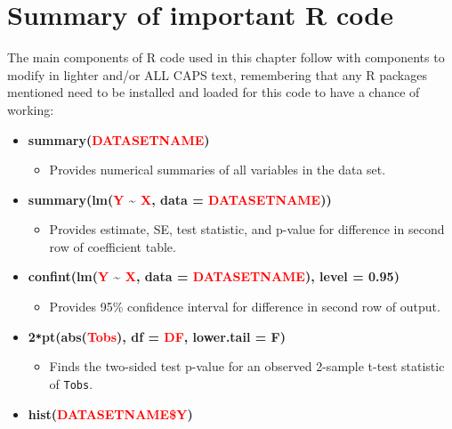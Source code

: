 \documentclass[
]{book}
\providecommand{\tightlist}{%
  \setlength{\itemsep}{0pt}\setlength{\parskip}{0pt}}
\begin{document}
\hypertarget{section2-12}{%
\section{Summary of important R code}\label{section2-12}}

The main components of R code used in this chapter follow with components to
modify in lighter and/or ALL CAPS text, remembering that any R packages mentioned
need to be installed and loaded for this code to have a chance of working:

\begin{itemize}
\item
  \textbf{summary(\textcolor{red}{DATASETNAME})}

  \begin{itemize}
  \tightlist
  \item
    Provides numerical summaries of all variables in the data set.
  \end{itemize}
\item
  \textbf{summary(lm(\textcolor{red}{Y} \textasciitilde{} \textcolor{red}{X},
  data = \textcolor{red}{DATASETNAME}))}

  \begin{itemize}
  \tightlist
  \item
    Provides estimate, SE, test statistic, and p-value for difference in second row of coefficient table. 
  \end{itemize}
\item
  \textbf{confint(lm(\textcolor{red}{Y} \textasciitilde{} \textcolor{red}{X},
  data = \textcolor{red}{DATASETNAME}), level = 0.95)}

  \begin{itemize}
  \tightlist
  \item
    Provides 95\%
    confidence interval for difference in second row of output. 
  \end{itemize}
\item
  \textbf{2\texttt{*}pt(abs(\textcolor{red}{Tobs}), df = \textcolor{red}{DF}, lower.tail = F)}

  \begin{itemize}
  \tightlist
  \item
    Finds the two-sided test p-value for an observed 2-sample t-test
    statistic of \texttt{Tobs}. 
  \end{itemize}
\item
  \textbf{hist(\textcolor{red}{DATASETNAME\$Y})}


\end{itemize}
\end{document}
